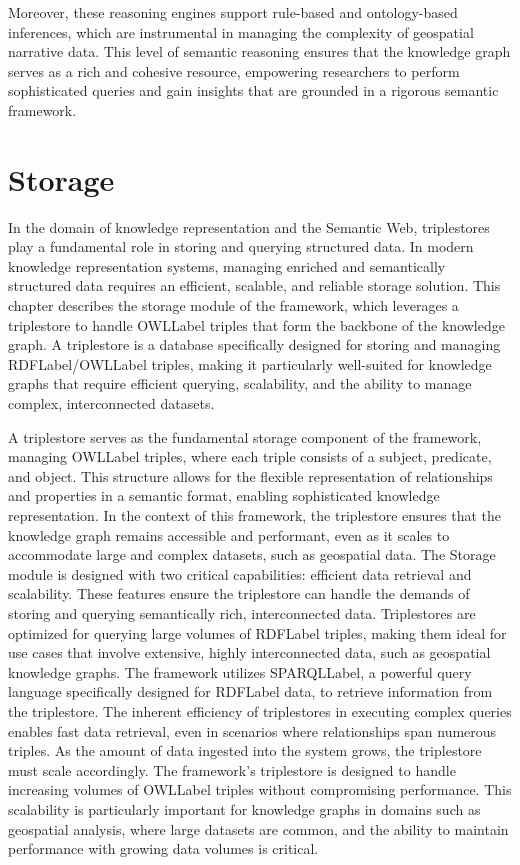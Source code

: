 Moreover, these reasoning engines support rule-based and ontology-based inferences, which are instrumental in managing the complexity of geospatial narrative data. This level of semantic reasoning ensures that the knowledge graph serves as a rich and cohesive resource, empowering researchers to perform sophisticated queries and gain insights that are grounded in a rigorous semantic framework.

\section{Storage}\label{VI-sec:storage}

In the domain of knowledge representation and the Semantic Web, triplestores play a fundamental role in storing and querying structured data. 
In modern knowledge representation systems, managing enriched and semantically structured data requires an efficient, scalable, and reliable storage solution. This chapter describes the storage module of the framework, which leverages a triplestore to handle \acrshort{OWLLabel} triples that form the backbone of the knowledge graph. A triplestore is a database specifically designed for storing and managing \acrshort{RDFLabel}/\acrshort{OWLLabel} triples, making it particularly well-suited for knowledge graphs that require efficient querying, scalability, and the ability to manage complex, interconnected datasets.

A triplestore serves as the fundamental storage component of the framework, managing \acrshort{OWLLabel} triples, where each triple consists of a subject, predicate, and object. This structure allows for the flexible representation of relationships and properties in a semantic format, enabling sophisticated knowledge representation. In the context of this framework, the triplestore ensures that the knowledge graph remains accessible and performant, even as it scales to accommodate large and complex datasets, such as geospatial data. The Storage module is designed with two critical capabilities: efficient data retrieval and scalability. These features ensure the triplestore can handle the demands of storing and querying semantically rich, interconnected data. Triplestores are optimized for querying large volumes of \acrshort{RDFLabel} triples, making them ideal for use cases that involve extensive, highly interconnected data, such as geospatial knowledge graphs. The framework utilizes \acrshort{SPARQLLabel}\cite{ericprudhommeauxSPARQLQueryLanguage2008}, a powerful query language specifically designed for \acrshort{RDFLabel} data, to retrieve information from the triplestore. The inherent efficiency of triplestores in executing complex queries enables fast data retrieval, even in scenarios where relationships span numerous triples. As the amount of data ingested into the system grows, the triplestore must scale accordingly. The framework's triplestore is designed to handle increasing volumes of \acrshort{OWLLabel} triples without compromising performance. This scalability is particularly important for knowledge graphs in domains such as geospatial analysis, where large datasets are common, and the ability to maintain performance with growing data volumes is critical.

